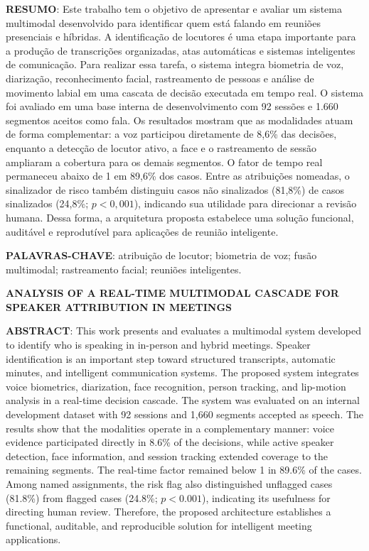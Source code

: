\documentclass[a4paper,11pt]{article}
\begin{document}



\vspace{0.5cm}
\noindent\textbf{RESUMO}: Este trabalho tem o objetivo de apresentar e avaliar um sistema multimodal desenvolvido para identificar quem está falando em reuniões presenciais e híbridas. A identificação de locutores é uma etapa importante para a produção de transcrições organizadas, atas automáticas e sistemas inteligentes de comunicação. Para realizar essa tarefa, o sistema integra biometria de voz, diarização, reconhecimento facial, rastreamento de pessoas e análise de movimento labial em uma cascata de decisão executada em tempo real. O sistema foi avaliado em uma base interna de desenvolvimento com 92 sessões e 1.660 segmentos aceitos como fala. Os resultados mostram que as modalidades atuam de forma complementar: a voz participou diretamente de 8,6\% das decisões, enquanto a detecção de locutor ativo, a face e o rastreamento de sessão ampliaram a cobertura para os demais segmentos. O fator de tempo real permaneceu abaixo de 1 em 89,6\% dos casos. Entre as atribuições nomeadas, o sinalizador de risco também distinguiu casos não sinalizados (81,8\%) de casos sinalizados (24,8\%; $p<0{,}001$), indicando sua utilidade para direcionar a revisão humana. Dessa forma, a arquitetura proposta estabelece uma solução funcional, auditável e reprodutível para aplicações de reunião inteligente.

\vspace{0.5cm}
\noindent\textbf{PALAVRAS-CHAVE}: atribuição de locutor; biometria de voz; fusão multimodal; rastreamento facial; reuniões inteligentes.

\vspace{0.5cm}
\begin{center}
\textbf{ANALYSIS OF A REAL-TIME MULTIMODAL CASCADE FOR SPEAKER ATTRIBUTION IN MEETINGS}
\end{center}

\noindent\textbf{ABSTRACT}: This work presents and evaluates a multimodal system developed to identify who is speaking in in-person and hybrid meetings. Speaker identification is an important step toward structured transcripts, automatic minutes, and intelligent communication systems. The proposed system integrates voice biometrics, diarization, face recognition, person tracking, and lip-motion analysis in a real-time decision cascade. The system was evaluated on an internal development dataset with 92 sessions and 1{,}660 segments accepted as speech. The results show that the modalities operate in a complementary manner: voice evidence participated directly in 8.6\% of the decisions, while active speaker detection, face information, and session tracking extended coverage to the remaining segments. The real-time factor remained below 1 in 89.6\% of the cases. Among named assignments, the risk flag also distinguished unflagged cases (81.8\%) from flagged cases (24.8\%; $p<0.001$), indicating its usefulness for directing human review. Therefore, the proposed architecture establishes a functional, auditable, and reproducible solution for intelligent meeting applications.
\end{document}
